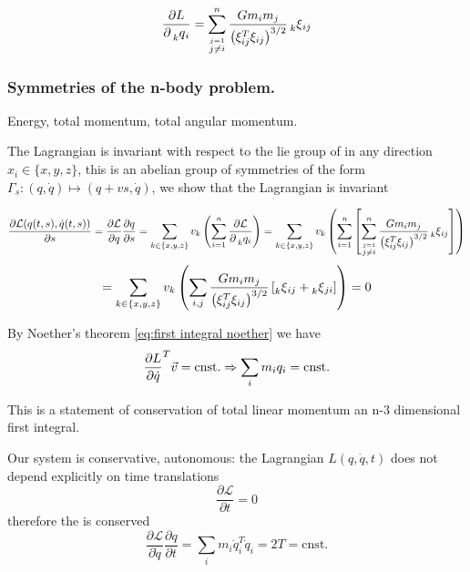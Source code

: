 \documentclass[12pt]{article}
\begin{document}
\begin{equation}\label{eq:partial lagrangian wrt qi}
    \frac{\partial L}{\partial \prescript{}{k}{q}_i} = \sum_{\stackrel{j=1}{j\neq i}}^n \frac{Gm_im_j}{\left( \xi_{ij}^T\xi_{ij} \right)^{3/2}} \prescript{}{k}{\xi}_{ij}
\end{equation}


\subsubsection{Symmetries of the n-body problem.}
Energy, total momentum, total angular momentum. 

The Lagrangian is invariant with respect to the lie group of  in any direction $x_i \in \{x,y,z\}$, this is an abelian group of symmetries of the form $\Gamma_s : (q,\dot q)\mapsto (q+vs,\dot q)$, we show that the Lagrangian is invariant

$$
\frac{\partial\mathcal L(q(t,s),\dot q(t,s))}{\partial s} = \frac{\partial\mathcal L}{\partial q}\frac{\partial q}{\partial s} = 
\sum_{k\in\{x,y,z\}} v_k\left( \sum_{i=1}^n \frac{\partial\mathcal L}{\partial \prescript{}{k}{q_i}}
\right)
= \sum_{k\in\{x,y,z\}} v_k\left(
\sum_{i=1}^n \left[
\sum_{\stackrel{j=1}{j\neq i}}^n \frac{Gm_im_j}{\left( \xi_{ij}^T\xi_{ij} \right)^{3/2}}\prescript{}{k}{\xi}_{ij}
\right] \right)
$$
$$
= \sum_{k\in\{x,y,z\}} v_k\left(
\sum_{i,j} \frac{Gm_im_j}{\left(\xi_{ij}^T\xi_{ij}\right)^{3/2}}\left[ \prescript{}{k}{\xi}_{ij} + \prescript{}{k}{\xi}_{ji} \right]
\right) = 0
$$

By Noether's theorem \eqref{eq:first integral noether} we have
\begin{equation}\label{eq:conserved total momentum}
    \frac{\partial L}{\partial \dot q}^T \vec v = \text{cnst.} \Rightarrow \sum_i m_iq_i = \text{cnst.}
\end{equation}

This is a statement of conservation of total linear momentum an n-3 dimensional first integral. 

Our system is conservative, autonomous: the Lagrangian $L(q,\dot q,t)$ does not depend explicitly on time translations
$$\frac{\partial\mathcal L}{\partial t} = 0$$
therefore the  is conserved
\begin{equation}\label{eq:conservation of energy noether}
\frac{\partial\mathcal L}{\partial \dot q}\frac{\partial q}{\partial t} = \sum_i m_i\dot q_i^T \dot q_i = 2T = \text{cnst.}\end{equation}
\end{document}
